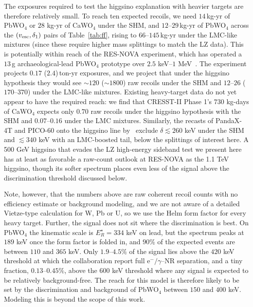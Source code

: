 \documentclass[reprint,superscriptaddress,preprintnumbers,amsmath,amssymb,aps,prd,tightenlines,longbibliography,nofootinbib]{revtex4-2}
\begin{document}
The exposures required to test the higgsino explanation with heavier targets are therefore relatively small. To reach ten expected recoils, we need $14$\,kg-yr of PbWO$_4$ or
$28$ kg-yr of CaWO$_4$ under the SHM, and $12$--$29$\,kg-yr of PbWO$_4$ across the
$(v_{\rm esc},\delta_1)$ pairs of Table~\ref{tab:ff}, rising to $66$--$145$\,kg-yr under
the LMC-like mixtures (since these require higher mass splittings to match the LZ data). This is potentially within reach of the RES-NOVA experiment, which has operated a $13$\,g archaeological-lead PbWO$_4$ prototype over
$2.5$ keV--$1$ MeV~\cite{RES-NOVA:2026}. The experiment projects $0.17$ ($2.4$)\,ton-yr exposures, and we project that under the higgsino hypothesis they would see $\sim$$120$ ($\sim$$1800$) raw recoils under
the SHM and $12$--$26$ ($170$--$370$) under the LMC-like mixtures. Existing heavy-target
data do not yet appear to have the required reach: we find that CRESST-II Phase 1's $730$ kg-days of CaWO$_4$ expects only $0.70$
raw recoils under the higgsino hypothesis with the SHM and $0.07$--$0.16$ under the LMC mixtures. Similarly, the recasts of
PandaX-4T and PICO-60 onto the higgsino line by~\cite{Graham:2024hah}
exclude $\delta \lesssim 260$ keV under the SHM and $\lesssim 340$ keV with an
LMC-boosted tail, below the splittings of interest here.  A 500 GeV higgsino that evades the LZ high-energy sideband test we present here has  at least as favorable a raw-count outlook at RES-NOVA as the 1.1 TeV higgsino, though its softer spectrum places even less of the signal above the discrimination threshold discussed below.

Note, however, that the numbers above are raw coherent recoil counts with no  efficiency estimate or background modeling, and we are not aware of a detailed Vietze-type calculation for W, Pb or U, so we use the Helm form factor for every heavy target. Further, the signal does not sit where the discrimination is best. On PbWO$_4$ the kinematic scale is $E_R^\star = 334$ keV on lead, but the spectrum peaks at $189$ keV once the form
factor is folded in, and $90\%$ of the expected events are between $110$ and $365$ keV. Only $1.9$--$4.5\%$ of the signal lies above the $420$ keV threshold at which the collaboration report full 
e$^-/\gamma$--NR separation, and a tiny fraction, $0.13$--$0.45\%$, above the $600$ keV threshold where any signal is expected to be relatively
background-free. The reach for this model is therefore likely to be set by the discrimination and
background of PbWO$_4$ between $150$ and $400$ keV. Modeling this is beyond the scope of this work.
\end{document}
